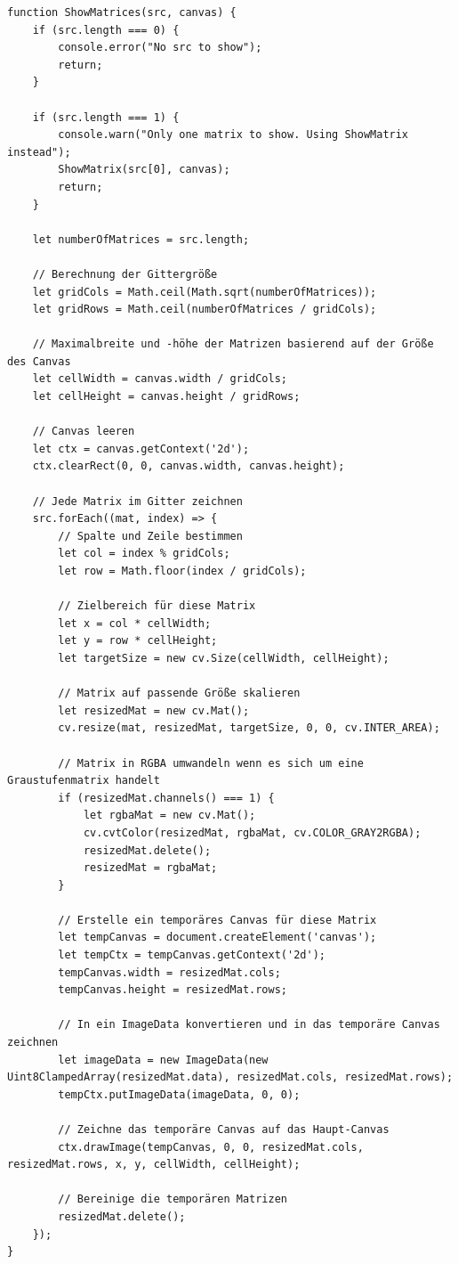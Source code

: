 \begin{lstlisting}[style=JavaScript]
function ShowMatrices(src, canvas) {
    if (src.length === 0) {
        console.error("No src to show");
        return;
    }

    if (src.length === 1) {
        console.warn("Only one matrix to show. Using ShowMatrix instead");
        ShowMatrix(src[0], canvas);
        return;
    }

    let numberOfMatrices = src.length;

    // Berechnung der Gittergröße
    let gridCols = Math.ceil(Math.sqrt(numberOfMatrices));
    let gridRows = Math.ceil(numberOfMatrices / gridCols);

    // Maximalbreite und -höhe der Matrizen basierend auf der Größe des Canvas
    let cellWidth = canvas.width / gridCols;
    let cellHeight = canvas.height / gridRows;

    // Canvas leeren
    let ctx = canvas.getContext('2d');
    ctx.clearRect(0, 0, canvas.width, canvas.height);

    // Jede Matrix im Gitter zeichnen
    src.forEach((mat, index) => {
        // Spalte und Zeile bestimmen
        let col = index % gridCols;
        let row = Math.floor(index / gridCols);

        // Zielbereich für diese Matrix
        let x = col * cellWidth;
        let y = row * cellHeight;
        let targetSize = new cv.Size(cellWidth, cellHeight);

        // Matrix auf passende Größe skalieren
        let resizedMat = new cv.Mat();
        cv.resize(mat, resizedMat, targetSize, 0, 0, cv.INTER_AREA);

        // Matrix in RGBA umwandeln wenn es sich um eine Graustufenmatrix handelt
        if (resizedMat.channels() === 1) {
            let rgbaMat = new cv.Mat();
            cv.cvtColor(resizedMat, rgbaMat, cv.COLOR_GRAY2RGBA);
            resizedMat.delete();
            resizedMat = rgbaMat;
        }

        // Erstelle ein temporäres Canvas für diese Matrix
        let tempCanvas = document.createElement('canvas');
        let tempCtx = tempCanvas.getContext('2d');
        tempCanvas.width = resizedMat.cols;
        tempCanvas.height = resizedMat.rows;

        // In ein ImageData konvertieren und in das temporäre Canvas zeichnen
        let imageData = new ImageData(new Uint8ClampedArray(resizedMat.data), resizedMat.cols, resizedMat.rows);
        tempCtx.putImageData(imageData, 0, 0);

        // Zeichne das temporäre Canvas auf das Haupt-Canvas
        ctx.drawImage(tempCanvas, 0, 0, resizedMat.cols, resizedMat.rows, x, y, cellWidth, cellHeight);

        // Bereinige die temporären Matrizen
        resizedMat.delete();
    });
}
\end{lstlisting}

